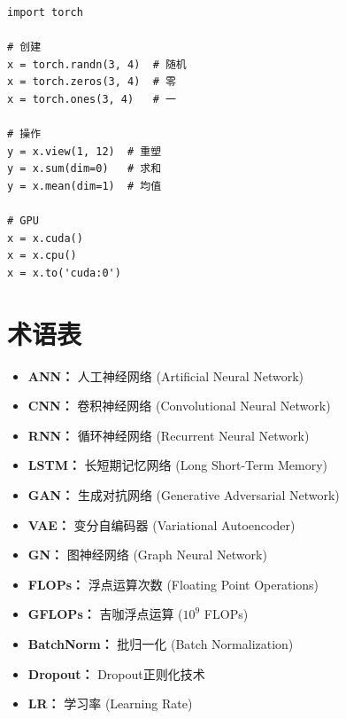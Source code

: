 \begin{verbatim}
import torch

# 创建
x = torch.randn(3, 4)  # 随机
x = torch.zeros(3, 4)  # 零
x = torch.ones(3, 4)   # 一

# 操作
y = x.view(1, 12)  # 重塑
y = x.sum(dim=0)   # 求和
y = x.mean(dim=1)  # 均值

# GPU
x = x.cuda()
x = x.cpu()
x = x.to('cuda:0')
\end{verbatim}

\chapter{术语表}

\begin{itemize}
    \item \textbf{ANN：} 人工神经网络 (Artificial Neural Network)
    \item \textbf{CNN：} 卷积神经网络 (Convolutional Neural Network)
    \item \textbf{RNN：} 循环神经网络 (Recurrent Neural Network)
    \item \textbf{LSTM：} 长短期记忆网络 (Long Short-Term Memory)
    \item \textbf{GAN：} 生成对抗网络 (Generative Adversarial Network)
    \item \textbf{VAE：} 变分自编码器 (Variational Autoencoder)
    \item \textbf{GN：} 图神经网络 (Graph Neural Network)
    \item \textbf{FLOPs：} 浮点运算次数 (Floating Point Operations)
    \item \textbf{GFLOPs：} 吉咖浮点运算 ($10^9$ FLOPs)
    \item \textbf{BatchNorm：} 批归一化 (Batch Normalization)
    \item \textbf{Dropout：} Dropout正则化技术
    \item \textbf{LR：} 学习率 (Learning Rate)
\end{itemize}
